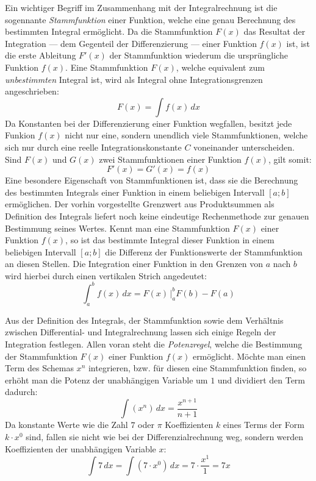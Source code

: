 Ein wichtiger Begriff im Zusammenhang mit der Integralrechnung ist die sogennante \emph{Stammfunktion} einer Funktion, welche eine genau Berechnung des bestimmten Integral erm\"{o}glicht. Da die Stammfunktion $F(x)$ das Resultat der Integration --- dem Gegenteil der Differenzierung --- einer Funktion $f(x)$ ist, ist die erste Ableitung $F'(x)$ der Stammfunktion wiederum die urspr\"{u}ngliche Funktion $f(x)$. Eine Stammfunktion $F(x)$, welche equivalent zum \emph{unbestimmten} Integral ist, wird als Integral ohne Integrationsgrenzen angeschrieben: $$F(x) = \int f(x)\,dx$$ Da Konstanten bei der Differenzierung einer Funktion wegfallen, besitzt jede Funkion $f(x)$ nicht nur eine, sondern unendlich viele Stammfunktionen, welche sich nur durch eine reelle Integrationskonstante $C$ voneinander unterscheiden. Sind $F(x)$ und $G(x)$ zwei Stammfunktionen einer Funktion $f(x)$, gilt somit: $$F'(x) = G'(x) = f(x)$$ Eine besondere Eigenschaft von Stammfunktionen ist, dass sie die Berechnung des bestimmten Integrals einer Funktion in einem beliebigen Intervall $[a ; b]$ erm\"{o}glichen. Der vorhin vorgestellte Grenzwert aus Produktsummen als Definition des Integrals liefert noch keine eindeutige Rechenmethode zur genauen Bestimmung seines Wertes. Kennt man eine Stammfunktion $F(x)$ einer Funktion $f(x)$, so ist das bestimmte Integral dieser Funktion in einem beliebigen Intervall $[a ; b]$ die Differenz der Funktionswerte der Stammfunktion an diesen Stellen. Die Integration einer Funktion in den Grenzen von $a$ nach $b$ wird hierbei durch einen vertikalen Strich angedeutet: $$\int_a^b f(x) \, dx = F(x) \, \Big|_a^b F(b) - F(a)$$


Aus der Definition des Integrals, der Stammfunktion sowie dem Verh\"{a}ltnis zwischen Differential- und Integralrechnung lassen sich einige Regeln der Integration festlegen. Allen voran steht die \emph{Potenzregel}, welche die Bestimmung der Stammfunktion $F(x)$ einer Funktion $f(x)$ erm\"{o}glicht. M\"{o}chte man einen Term des Schemas $x^n$ integrieren, bzw. f\"{u}r diesen eine Stammfunktion finden, so erh\"{o}ht man die Potenz der unabh\"{a}ngigen Variable um $1$ und dividiert den Term dadurch: $$\int (x^n) \, dx = \frac{x^{n + 1}}{n + 1}$$ Da konstante Werte wie die Zahl $7$ oder $\pi$ Koeffizienten $k$ eines Terms der Form $k \cdot x^0$ sind, fallen sie nicht wie bei der Differenzialrechnung weg, sondern werden Koeffizienten der unabh\"{a}ngigen Variable $x$: $$\int 7 \, dx = \int (7 \cdot x^0) \, dx = 7 \cdot \frac{x^1}{1} = 7x$$ 

